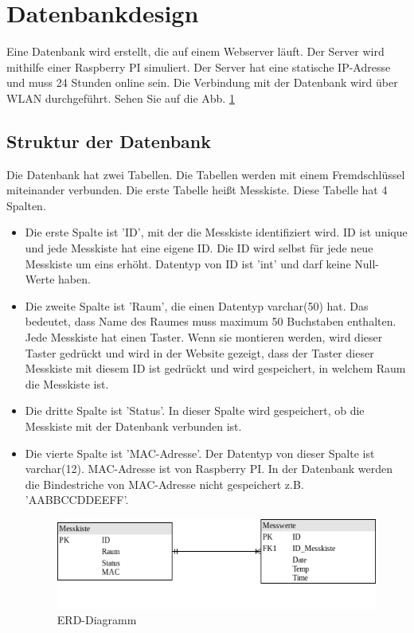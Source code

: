 	\section{Datenbankdesign}
	Eine Datenbank wird erstellt, die auf einem Webserver l\"auft. Der Server wird mithilfe einer Raspberry PI simuliert. Der Server hat eine statische IP-Adresse und muss 24 Stunden online sein. Die Verbindung mit der Datenbank wird \"uber WLAN durchgef\"uhrt. Sehen Sie auf die Abb. \ref{fi:ERD}
	\subsection{Struktur der Datenbank}
	Die Datenbank hat zwei Tabellen. Die Tabellen werden mit einem Fremdschl\"ussel miteinander verbunden. Die erste Tabelle hei{\ss}t Messkiste. Diese Tabelle hat 4 Spalten. 
	\begin{itemize}
		\item Die erste Spalte ist 'ID', mit der die Messkiste identifiziert wird. ID ist unique und jede Messkiste hat eine eigene ID. Die ID wird selbst f\"ur jede neue Messkiste um eins erh\"oht. Datentyp von ID ist 'int' und darf keine Null-Werte haben. 
		\item Die zweite Spalte ist 'Raum', die einen Datentyp varchar(50) hat. Das bedeutet, dass Name des Raumes muss maximum 50 Buchstaben enthalten. Jede Messkiste hat einen Taster. Wenn sie montieren werden, wird dieser Taster gedr\"uckt und wird in der Website gezeigt, dass der Taster dieser Messkiste mit diesem ID ist gedr\"uckt und wird gespeichert, in welchem Raum die Messkiste ist.
		\item Die dritte Spalte ist 'Status'. In dieser Spalte wird gespeichert, ob die Messkiste mit der Datenbank verbunden ist. 
		\item Die vierte Spalte ist 'MAC-Adresse'. Der Datentyp von dieser Spalte ist varchar(12). MAC-Adresse ist von Raspberry PI. In der Datenbank werden die Bindestriche von MAC-Adresse nicht gespeichert z.B. 'AABBCCDDEEFF'.
		\begin{figure}
			\centering
			\includegraphics[scale=0.7]{./bilder/db.png}
			\caption{ERD-Diagramm}
			\label{fi:ERD}
		\end{figure} 
		\end{itemize}
